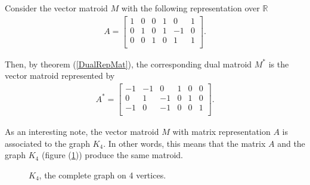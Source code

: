 \begin{exmp}
    Consider the vector matroid $M$ with the following representation over $\mathbb{R}$
    \begin{align*}
        A = \begin{bmatrix}
            1 & 0 & 0 & 1 & 0 & 1 \\
            0 & 1 & 0 & 1 & -1 & 0 \\
            0 & 0 & 1 & 0 & 1 & 1 \\
        \end{bmatrix}.
    \end{align*}

Then, by theorem (\ref{DualRepMat}), the corresponding dual matroid $M^*$ is the vector matroid represented by 
\begin{align*}
        A^* = \begin{bmatrix}
            -1 & -1 & 0 & 1 & 0 & 0 \\
            0 & 1 & -1 & 0 & 1 & 0 \\
            -1 & 0 & -1 & 0 & 0 & 1 \\
        \end{bmatrix}.
\end{align*}

As an interesting note, the vector matroid $M$ with matrix representation $A$ is associated to the graph $K_4$. In other words, this means that the matrix $A$ and the graph $K_4$ (figure (\ref{K4Graph})) produce the same matroid.

       \begin{figure}[H]
        \centering
            \caption{$K_4$, the complete graph on 4 vertices.}
            \label{K4Graph}
        \end{figure}


\end{exmp}

